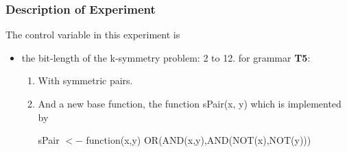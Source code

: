 \begin{frame}
\frametitle{
Description of Experiment
}
The control variable in this experiment is
\begin{itemize}
\item the bit-length of the k-symmetry problem: 2 to 12.
       for grammar {\bf T5}:
\begin{enumerate}
\item With symmetric pairs.
\item And a new base function,
       the function sPair(x, y) which is implemented by
 
 sPair $<-$ function(x,y) {OR(AND(x,y),AND(NOT(x),NOT(y)))}
\end{enumerate}
\end{itemize}
\end{frame}